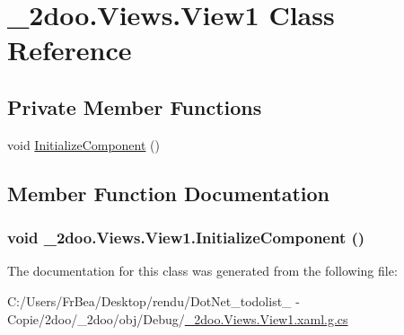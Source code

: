 \hypertarget{class__2doo_1_1_views_1_1_view1}{
\section{\_\-2doo.Views.View1 Class Reference}
\label{class__2doo_1_1_views_1_1_view1}
}
\subsection*{Private Member Functions}
\begin{CompactItemize}
\item 
void \hyperlink{class__2doo_1_1_views_1_1_view1_94adc46ad3c0381ba3527047a9853c75}{InitializeComponent} ()
\end{CompactItemize}


\subsection{Member Function Documentation}
\hypertarget{class__2doo_1_1_views_1_1_view1_94adc46ad3c0381ba3527047a9853c75}{
\subsubsection[{InitializeComponent}]{\setlength{\rightskip}{0pt plus 5cm}void \_\-2doo.Views.View1.InitializeComponent ()}}
\label{class__2doo_1_1_views_1_1_view1_94adc46ad3c0381ba3527047a9853c75}




The documentation for this class was generated from the following file:\begin{CompactItemize}
\item 
C:/Users/FrBea/Desktop/rendu/DotNet\_\-todolist\_ - Copie/2doo/\_\-2doo/obj/Debug/\hyperlink{__2doo_8_views_8_view1_8xaml_8g_8cs}{\_\-2doo.Views.View1.xaml.g.cs}\end{CompactItemize}
